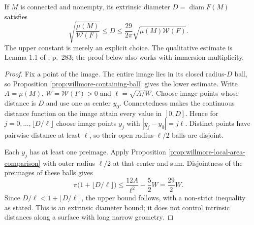 \begin{theorem}\label{thm:willmore-diameter-estimate}
If $M$ is connected and nonempty, its extrinsic diameter $D=\operatorname{diam}F(M)$ satisfies
\[
 \sqrt{\frac{\mu(M)}{\mathcal W(F)}}\leq D
 \leq\frac{29}{2\pi}\sqrt{\mu(M)\mathcal W(F)}.
\]
The upper constant is merely an explicit choice. The qualitative estimate is Lemma 1.1 of \cite{SimW93}, p.~283; the proof below also works with immersion multiplicity.
\end{theorem}
\begin{proof}
Fix a point of the image. The entire image lies in its closed radius-$D$ ball, so Proposition \ref{prop:willmore-containing-ball} gives the lower estimate. Write $A=\mu(M)$, $W=\mathcal W(F)>0$ and $\ell=\sqrt{A/W}$. Choose image points whose distance is $D$ and use one as center $y_0$. Connectedness makes the continuous distance function on the image attain every value in $[0,D]$. Hence for $j=0,\ldots,\lfloor D/\ell\rfloor$ choose image points $y_j$ with $|y_j-y_0|=j\ell$. Distinct points have pairwise distance at least $\ell$, so their open radius-$\ell/2$ balls are disjoint.

Each $y_j$ has at least one preimage. Apply Proposition \ref{prop:willmore-local-area-comparison} with outer radius $\ell/2$ at that center and sum. Disjointness of the preimages of these balls gives
\[
 \pi\bigl(1+\lfloor D/\ell\rfloor\bigr)
 \leq\frac{12A}{\ell^2}+\frac52W=\frac{29}{2}W.
\]
Since $D/\ell<1+\lfloor D/\ell\rfloor$, the upper bound follows, with a non-strict inequality as stated. This is an extrinsic diameter bound; it does not control intrinsic distances along a surface with long narrow geometry.
\end{proof}
